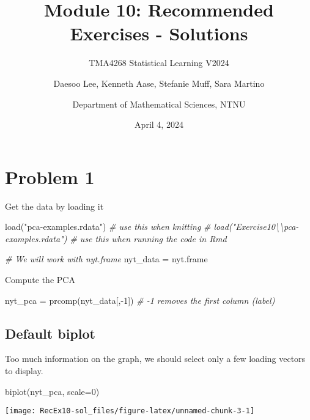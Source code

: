 \documentclass[
]{article}
\title{Module 10: Recommended Exercises - Solutions}
\subtitle{TMA4268 Statistical Learning V2024}
\author{Daesoo Lee, Kenneth Aase, Stefanie Muff, Sara
Martino \and Department of Mathematical Sciences, NTNU}
\date{April 4, 2024}
\newenvironment{Shaded}{\begin{snugshade}}{\end{snugshade}}
\newcommand{\AttributeTok}[1]{\textcolor[rgb]{0.77,0.63,0.00}{#1}}
\newcommand{\CommentTok}[1]{\textcolor[rgb]{0.56,0.35,0.01}{\textit{#1}}}
\newcommand{\DecValTok}[1]{\textcolor[rgb]{0.00,0.00,0.81}{#1}}
\newcommand{\FunctionTok}[1]{\textcolor[rgb]{0.00,0.00,0.00}{#1}}
\newcommand{\NormalTok}[1]{#1}
\newcommand{\OtherTok}[1]{\textcolor[rgb]{0.56,0.35,0.01}{#1}}
\newcommand{\SpecialCharTok}[1]{\textcolor[rgb]{0.00,0.00,0.00}{#1}}
\newcommand{\StringTok}[1]{\textcolor[rgb]{0.31,0.60,0.02}{#1}}
\begin{document}
\maketitle

\hypertarget{problem-1}{%
\section{Problem 1}\label{problem-1}}

Get the data by loading it

\begin{Shaded}
\begin{Highlighting}[]
\FunctionTok{load}\NormalTok{(}\StringTok{"pca{-}examples.rdata"}\NormalTok{)  }\CommentTok{\# use this when knitting}
\CommentTok{\# load("Exercise10\textbackslash{}\textbackslash{}pca{-}examples.rdata")  \# use this when running the code in Rmd}

\CommentTok{\# We will work with nyt.frame}
\NormalTok{nyt\_data }\OtherTok{=}\NormalTok{ nyt.frame}
\end{Highlighting}
\end{Shaded}

Compute the PCA

\begin{Shaded}
\begin{Highlighting}[]
\NormalTok{nyt\_pca }\OtherTok{=} \FunctionTok{prcomp}\NormalTok{(nyt\_data[,}\SpecialCharTok{{-}}\DecValTok{1}\NormalTok{])  }\CommentTok{\# {-}1 removes the first column (label)}
\end{Highlighting}
\end{Shaded}

\hypertarget{default-biplot}{%
\subsection{Default biplot}\label{default-biplot}}

Too much information on the graph, we should select only a few loading
vectors to display.

\begin{Shaded}
\begin{Highlighting}[]
\FunctionTok{biplot}\NormalTok{(nyt\_pca, }\AttributeTok{scale=}\DecValTok{0}\NormalTok{)}
\end{Highlighting}
\end{Shaded}

\begin{center}\texttt{[image: RecEx10-sol\_files/figure-latex/unnamed-chunk-3-1]} \end{center}
\end{document}
